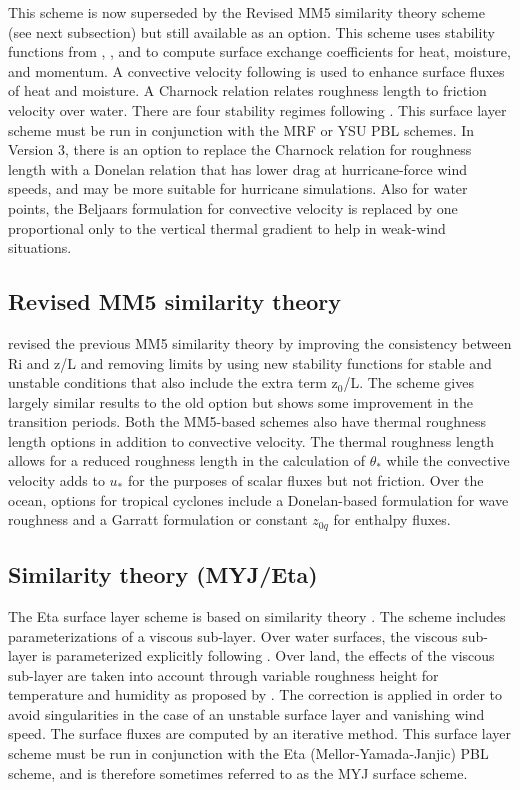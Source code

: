 This scheme is now superseded by the Revised MM5 similarity theory scheme
(see next subsection) but still available as an option.
This scheme uses stability functions from \citet{paulson70}, \citet{dyer70}, 
and \citet{webb70}
to compute surface exchange coefficients for heat, moisture, and momentum. 
A convective velocity following \citet{beljaars94} is used to enhance surface 
fluxes of heat and moisture. A Charnock relation relates 
roughness length to friction velocity over water. There are four stability 
regimes following \citet{zhanganthes82}.
This surface layer scheme must be run in conjunction with the MRF or
YSU PBL schemes. In Version 3, there is an option to replace the Charnock
relation for roughness length with a Donelan relation that has lower
drag at hurricane-force wind speeds, and may be more suitable for hurricane
simulations. Also for water points, the Beljaars formulation for convective
velocity is replaced by one proportional only to the vertical thermal gradient
to help in weak-wind situations.

\subsection{Revised MM5 similarity theory}

\citet{jimenez12} revised the previous MM5 similarity theory by improving the
consistency between Ri and z/L and removing limits by using new stability
functions for stable and unstable conditions that also include the extra term
z$_0$/L. The scheme gives largely similar results to the old option but shows
some improvement in the transition periods. Both the MM5-based schemes
also have thermal roughness length options in addition to convective velocity.
The thermal roughness length allows for a reduced roughness length in 
the calculation of $\theta_*$ while the convective velocity adds to $u_*$
for the purposes of scalar fluxes but not friction. Over the ocean, options
for tropical cyclones include a Donelan-based formulation for wave
roughness and a Garratt formulation or constant $z_{0q}$ for enthalpy fluxes.

\subsection{Similarity theory (MYJ/Eta)}

The Eta surface layer scheme \citep{janjic96,janjic02} is based 
on similarity theory \citep{monin54}. The scheme 
includes parameterizations of a viscous sub-layer. Over water surfaces, the 
viscous sub-layer is parameterized explicitly following \citet{janjic94}. 
Over land, the effects of the viscous sub-layer are taken into account 
through variable roughness height for temperature and humidity as proposed by 
\citet{zilit95}. The \citet{beljaars94} correction is applied in order 
to avoid singularities in the case of an unstable surface layer and vanishing 
wind speed. The surface fluxes are computed by an iterative method. 
This surface layer scheme must be run in conjunction with the Eta
(Mellor-Yamada-Janjic) PBL scheme, and is therefore sometimes referred to
as the MYJ surface scheme.

